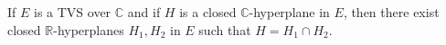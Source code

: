 If $E$ is a TVS over $\mathbb{C}$ and if $H$ is a closed $\mathbb{C}$-hyperplane in $E$, then there exist closed $\mathbb{R}$-hyperplanes $H_1, H_2$ in $E$ such that $H = H_1 \cap H_2$.